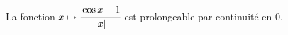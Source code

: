 La fonction $x\mapsto \cfrac{\cos x-1}{|x|}$ est prolongeable par continuité en $0$.

\begin{reponses}
\end{reponses}

